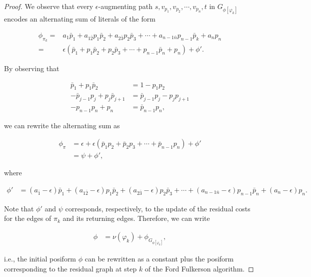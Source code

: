 \begin{proof}

We observe that every $\epsilon$-augmenting path $s,v_{p_1},v_{p_2},\cdots,v_{p_n},t$ in $G_{\phi [\varphi_k]}$ encodes an alternating sum of literals of the form

\begin{align*}
	\phi_{\pi_k} =& a_1\bar{p}_1 + a_{1\bar{2}}p_1\bar{p}_2 + a_{2\bar{3}}p_2\bar{p}_3 + \cdots + a_{n-1\bar{n}}p_{n-1}\bar{p}_k + a_np_n \\
	=&\epsilon( \bar{p}_1 + p_1\bar{p}_2 + p_2\bar{p}_3 + \cdots + p_{n-1}\bar{p}_n + p_n ) + \phi '.
\end{align*}

By observing that

\begin{align*}
	\bar{p}_1 + p_1\bar{p}_2 &= 1 - p_1p_2 \\
	-\bar{p}_{j-1}p_{j} + p_j\bar{p}_{j+1} &= \bar{p}_{j-1}p_j - p_jp_{j+1} \\
	-p_{n-1}p_n + p_n &= \bar{p}_{n-1}p_n,
\end{align*}

we can rewrite the alternating sum as

\begin{align*}
	\phi_{\pi} &= \epsilon + \epsilon( \bar{p}_1p_2 + \bar{p}_2p_3 + \cdots + \bar{p}_{n-1}p_n ) + \phi ' \\
	&= \psi + \phi ',	
\end{align*}

where

\begin{align*}
	\phi ' &= (a_{\bar{1}}-\epsilon)\bar{p}_1 + (a_{1\bar{2}} - \epsilon) p_1\bar{p}_2 + (a_{2\bar{3}}  - \epsilon)p_2\bar{p}_3 + \cdots + (a_{n-1\bar{n}} - \epsilon)p_{n-1}\bar{p}_n + (a_n -\epsilon)p_n.
\end{align*}

Note that $\phi '$ and $\psi$ corresponds, respectively, to the update of the residual costs for the edges of $\pi_k$ and its returning edges. Therefore, we can write


\begin{align*}
	\phi &= \nu(\varphi_k) + \phi_{ G_{ \phi [\varphi_k] }},
\end{align*}

i.e., the initial posiform $\phi$ can be rewritten as a constant plus the posiform corresponding to the residual graph at step $k$ of  the Ford Fulkerson algorithm. 
\end{proof}

